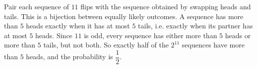 Pair each sequence of $11$ flips with the sequence obtained by swapping heads and tails. This is a bijection between equally likely outcomes. A sequence has more than $5$ heads exactly when it has at most $5$ tails, i.e. exactly when its partner has at most $5$ heads. Since $11$ is odd, every sequence has either more than $5$ heads or more than $5$ tails, but not both. So exactly half of the $2^{11}$ sequences have more than $5$ heads, and the probability is $\boxed{\dfrac12}$.
